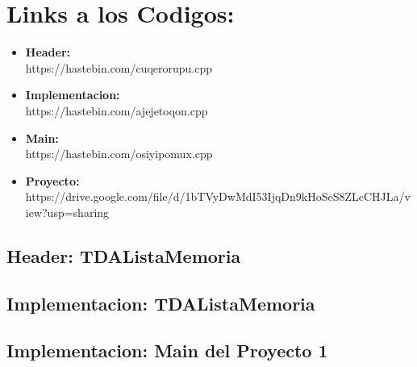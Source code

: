 \documentclass[10pt,a4paper]{article}
\begin{document}
\section*{Links a los Codigos: }
\noindent

\begin{itemize}

\item \textbf{Header: }\\
https://hastebin.com/cuqerorupu.cpp
\item\textbf{Implementacion: }\\
https://hastebin.com/ajejetoqon.cpp
\item\textbf{Main: }\\
https://hastebin.com/osiyipomux.cpp
\item \textbf{Proyecto:} \\ https://drive.google.com/file/d/1bTVyDwMdI53IjqDn9kHoSeS8ZLcCHJLa/view?usp=sharing

\end{itemize}


\subsection*{Header: TDAListaMemoria} 

\pagebreak
\subsection*{Implementacion: TDAListaMemoria} 

\pagebreak
\subsection*{Implementacion: Main del Proyecto 1}




%
%
\end{document}
